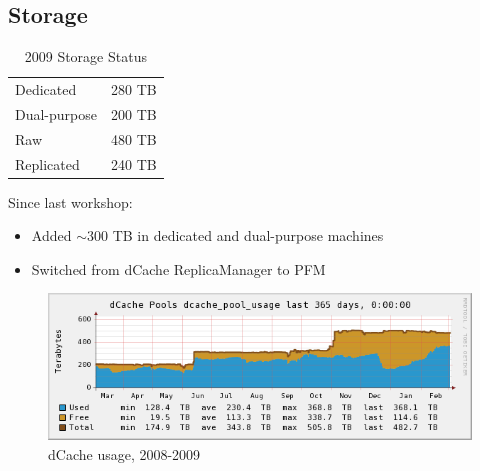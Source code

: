 \documentclass{beamer}
\newcommand{\ca}{\ensuremath{\sim}}
\begin{document}
\subsection{Storage}
\begin{frame}
\begin{table}
\begin{tabular}{lr}
    \toprule
    Dedicated       &   280 TB \\   %
    Dual-purpose    &   200 TB \\   %
    \midrule
    Raw             &   480 TB \\
    Replicated      &   240 TB \\
    \bottomrule
\end{tabular}
\caption{2009 Storage Status}
\label{2009_storage_status}
\end{table}

Since last workshop:
\begin{itemize}
    \item Added \ca{}300 TB in dedicated and dual-purpose machines
    \item Switched from dCache ReplicaManager to PFM
\end{itemize}
\end{frame}

\begin{frame}
\begin{figure}
    \includegraphics[width=\textwidth]{Graphics/dcache-usage-1yr.png}
    \caption{dCache usage, 2008-2009}
\end{figure}
\end{frame}
\end{document}
